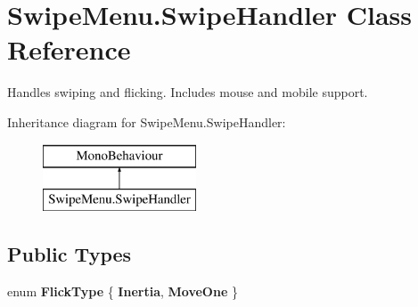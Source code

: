 \hypertarget{class_swipe_menu_1_1_swipe_handler}{}\section{Swipe\+Menu.\+Swipe\+Handler Class Reference}
\label{class_swipe_menu_1_1_swipe_handler}


Handles swiping and flicking. Includes mouse and mobile support.  


Inheritance diagram for Swipe\+Menu.\+Swipe\+Handler\+:\begin{figure}[H]
\begin{center}
\leavevmode
\includegraphics[height=2.000000cm]{class_swipe_menu_1_1_swipe_handler}
\end{center}
\end{figure}
\subsection*{Public Types}
\begin{DoxyCompactItemize}
\item 
\hypertarget{class_swipe_menu_1_1_swipe_handler_ab1b79ecf33b5ecd98d25e1a1dca2b7bd}{}enum {\bfseries Flick\+Type} \{ {\bfseries Inertia}, 
{\bfseries Move\+One}
 \}\label{class_swipe_menu_1_1_swipe_handler_ab1b79ecf33b5ecd98d25e1a1dca2b7bd}

\end{DoxyCompactItemize}
